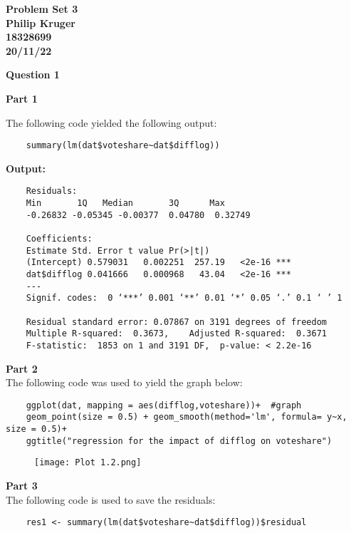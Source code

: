 \documentclass{article}
\begin{document}
	
	\begin{center}
		\textbf{
			{\LARGE Problem Set 3}\\
			Philip Kruger\\
			18328699\\
			20/11/22\\
		}
	\end{center}
	\vspace{10mm}
	\textbf{\Large Question 1\\}
	
	\noindent\textbf{\large Part 1\\}
	
The following code yielded the following output:\\
\begin{verbatim}
	summary(lm(dat$voteshare~dat$difflog))
\end{verbatim}
\textbf{Output:}
\begin{verbatim}
	Residuals:
	Min       1Q   Median       3Q      Max 
	-0.26832 -0.05345 -0.00377  0.04780  0.32749 
	
	Coefficients:
	Estimate Std. Error t value Pr(>|t|)    
	(Intercept) 0.579031   0.002251  257.19   <2e-16 ***
	dat$difflog 0.041666   0.000968   43.04   <2e-16 ***
	---
	Signif. codes:  0 ‘***’ 0.001 ‘**’ 0.01 ‘*’ 0.05 ‘.’ 0.1 ‘ ’ 1
	
	Residual standard error: 0.07867 on 3191 degrees of freedom
	Multiple R-squared:  0.3673,	Adjusted R-squared:  0.3671 
	F-statistic:  1853 on 1 and 3191 DF,  p-value: < 2.2e-16
\end{verbatim}


\textbf{\large Part 2\\}
The following code was used to yield the graph below:\\
\begin{verbatim}
	ggplot(dat, mapping = aes(difflog,voteshare))+  #graph
	geom_point(size = 0.5) + geom_smooth(method='lm', formula= y~x, size = 0.5)+
	ggtitle("regression for the impact of difflog on voteshare")
\end{verbatim}
\pagebreak
	\begin{figure}[h]
	\centering
	\graphicspath{ {c:/Users/User/Documents/PostGrad/Stats/Assignment 3\Assignment 3} }
	\texttt{[image: Plot 1.2.png]}

\end{figure}

	
	
	
	
\textbf{\large Part 3\\}
The following code is used to save the residuals:
\begin{verbatim}
	res1 <- summary(lm(dat$voteshare~dat$difflog))$residual
\end{verbatim}
\end{document}
